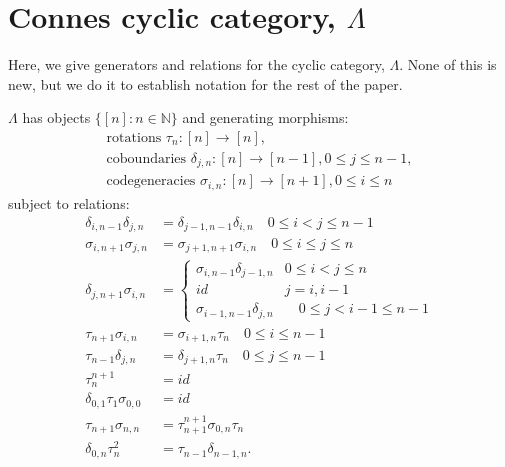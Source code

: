 \chapter{Connes cyclic category, $\Lambda$}\label{chap:lambda}
Here, we give generators and relations for 
the cyclic category, $\Lambda$. None of this 
is new, but we do it to establish notation 
for the rest of the paper.

$\Lambda$ has objects $\{[n]: n \in \mathbb{N}\}$ 
and generating morphisms:
\begin{equation} \label{eqn:cyclic_generators}
\begin{split}
\textrm{rotations } \tau_n:[n] \to [n], \\ 
\textrm{coboundaries } \delta_{j,n}: [n] \to [n-1], 0 \leq j \leq n-1, \\ 
\textrm{codegeneracies } \sigma_{i,n}:[n] \to [n+1], 0 \leq i \leq n
\end{split}
\end{equation}
subject to relations:
\begin{equation}\label{eqn:cyclic_relations}
\begin{split}
\delta_{i,n-1} \delta_{j,n} &= \delta_{j-1,n-1} \delta_{i,n} 
  \quad 0 \leq i < j \leq n-1 \\
\sigma_{i,n+1} \sigma_{j,n} &= \sigma_{j+1,n+1} \sigma_{i,n}
  \quad 0 \leq i \leq j \leq n \\
\delta_{j,n+1}\sigma_{i,n} &= 
  \begin{cases}
    \sigma_{i,n-1}\delta_{j-1,n} 
      & 0 \leq i < j \leq n\\
    id & j = i, i-1 \\
    \sigma_{i-1,n-1}\delta_{j,n} 
      & \quad 0 \leq j < i-1 \leq n-1
   \end{cases}\\
\tau_{n+1}\sigma_{i,n} &= \sigma_{i+1,n}\tau_n
  \quad 0 \leq i \leq n-1\\   
\tau_{n-1}\delta_{j,n} &= \delta_{j+1,n}\tau_n
  \quad 0 \leq j \leq n-1\\  
\tau_{n}^{n+1} &= id \\
\delta_{0,1}\tau_1\sigma_{0,0} &= id\\
\tau_{n+1} \sigma_{n,n} &= 
  \tau_{n+1}^{n+1} \sigma_{0,n} \tau_n\\
\delta_{0,n}\tau_n^2 &= \tau_{n-1}\delta_{n-1,n}. 
\end{split}
\end{equation}

